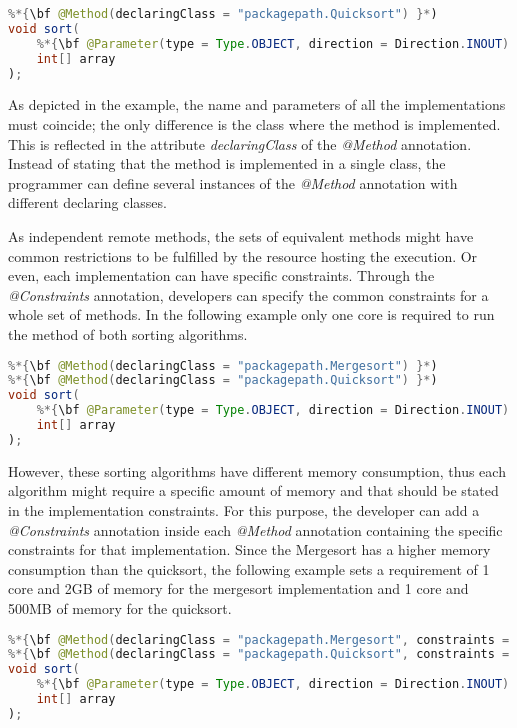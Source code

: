 \begin{lstlisting}[language=java]
%*{\bf @Method(declaringClass = "packagepath.Mergesort") }*)
%*{\bf @Method(declaringClass = "packagepath.Quicksort") }*)                       
void sort(
    %*{\bf @Parameter(type = Type.OBJECT, direction = Direction.INOUT) }*)
    int[] array
);
\end{lstlisting}

As depicted in the example, the name and parameters of all the implementations must coincide; the only
difference is the class where the method is implemented. This is reflected in the attribute \textit{declaringClass} of
the \textit{@Method} annotation. Instead of stating that the method is implemented in a single class, the
programmer can define several instances of the \textit{@Method} annotation with different declaring classes.

As independent remote methods, the sets of equivalent methods might have common restrictions to be
fulfilled by the resource hosting the execution. Or even, each implementation can have specific constraints.
Through the \textit{@Constraints} annotation, developers can specify the common constraints for a whole set of
methods. In the following example only one core is required to run the method of both sorting algorithms.

\begin{lstlisting}[language=java]
%*{\bf @Constraints(computingUnits = "1") }*)
%*{\bf @Method(declaringClass = "packagepath.Mergesort") }*)
%*{\bf @Method(declaringClass = "packagepath.Quicksort") }*)  
void sort(
    %*{\bf @Parameter(type = Type.OBJECT, direction = Direction.INOUT) }*)
    int[] array
);
\end{lstlisting}

However, these sorting algorithms have different memory consumption, thus each algorithm might require a
specific amount of memory and that should be stated in the implementation constraints. For this purpose, the
developer can add a \textit{@Constraints} annotation inside each \textit{@Method} annotation containing the specific constraints for that
implementation. Since the Mergesort has a higher memory consumption than the quicksort, the following
example sets a requirement of 1 core and 2GB of memory for the mergesort implementation and 1 core and
500MB of memory for the quicksort.

\begin{lstlisting}[language=java]
%*{\bf @Constraints(computingUnits = "1") }*)
%*{\bf @Method(declaringClass = "packagepath.Mergesort", constraints = @Constraints(memorySize = "2.0")) }*)
%*{\bf @Method(declaringClass = "packagepath.Quicksort", constraints = @Constraints(memorySize = "0.5")) }*)
void sort(
    %*{\bf @Parameter(type = Type.OBJECT, direction = Direction.INOUT) }*)
    int[] array
);
\end{lstlisting}


